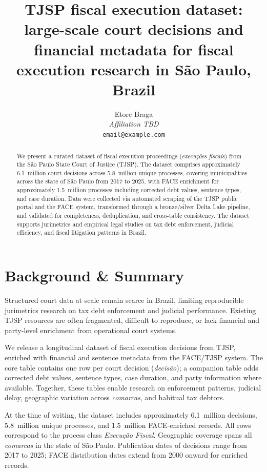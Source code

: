 \documentclass[11pt,a4paper]{article}
\title{TJSP fiscal execution dataset: large-scale court decisions and financial metadata for fiscal execution research in São Paulo, Brazil}
\author{%
  Etore Braga\\
  \textit{Affiliation TBD}\\
  \texttt{email@example.com}
}
\date{}
\begin{document}
\maketitle

\begin{abstract}
We present a curated dataset of fiscal execution proceedings (\emph{execu\c{c}\~oes fiscais}) from the S\~ao Paulo State Court of Justice (TJSP). The dataset comprises approximately 6.1~million court decisions across 5.8~million unique processes, covering municipalities across the state of S\~ao Paulo from 2017 to 2025, with FACE enrichment for approximately 1.5~million processes including corrected debt values, sentence types, and case duration. Data were collected via automated scraping of the TJSP public portal and the FACE system, transformed through a bronze/silver Delta Lake pipeline, and validated for completeness, deduplication, and cross-table consistency. The dataset supports jurimetrics and empirical legal studies on tax debt enforcement, judicial efficiency, and fiscal litigation patterns in Brazil.
\end{abstract}

\section*{Background \& Summary}

Structured court data at scale remain scarce in Brazil, limiting reproducible jurimetrics research on tax debt enforcement and judicial performance. Existing TJSP resources are often fragmented, difficult to reproduce, or lack financial and party-level enrichment from operational court systems.

We release a longitudinal dataset of fiscal execution decisions from TJSP, enriched with financial and sentence metadata from the FACE/TJSP system. The core table contains one row per court decision (\emph{decis\~ao}); a companion table adds corrected debt values, sentence types, case duration, and party information where available. Together, these tables enable research on enforcement patterns, judicial delay, geographic variation across \emph{comarcas}, and habitual tax debtors.

At the time of writing, the dataset includes approximately 6.1~million decisions, 5.8~million unique processes, and 1.5~million FACE-enriched records. All rows correspond to the process class \emph{Execu\c{c}\~ao Fiscal}. Geographic coverage spans all \emph{comarcas} in the state of S\~ao Paulo. Publication dates of decisions range from 2017 to 2025; FACE distribution dates extend from 2000 onward for enriched records.
\end{document}
